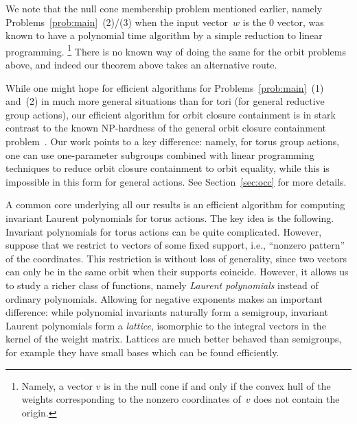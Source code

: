 \documentclass[10pt,a4paper]{article}
\theoremstyle{definition}
\numberwithin{equation}{section}
\begin{document}
We note that the null cone membership problem mentioned earlier, namely Problems~\ref{prob:main}~(2)/(3) when the input vector~$w$ is the $0$ vector,
was known to have a polynomial time algorithm by a simple reduction to linear programming.
\footnote{
Namely, a vector $v$ is in the null cone if and only if the convex hull of the weights corresponding to the nonzero coordinates of~$v$ does not contain the origin.}
There is no known way of doing the same for the orbit problems above, and indeed our theorem above takes an alternative route.

While one might hope for efficient algorithms for Problems~\ref{prob:main}~(1) and~(2) in much more general situations than for tori (for general reductive group actions), our efficient algorithm for orbit closure containment is in stark contrast to the known NP-hardness of the general orbit closure containment problem~\cite{BILPS:20}.
Our work points to a key difference: namely, for torus group actions, one can use one-parameter subgroups combined with linear programming techniques to reduce orbit closure containment to orbit equality, while this is impossible in this form for general actions.
See Section~\ref{sec:occ} for more details.

A common core underlying all our results is an efficient algorithm for computing invariant Laurent polynomials for torus actions.
The key idea is the following.
Invariant polynomials for torus actions can be quite complicated.
However, suppose that we restrict to vectors of some fixed support, i.e., ``nonzero pattern'' of the coordinates.
This restriction is without loss of generality, since two vectors can only be in the same orbit when their supports coincide.
However, it allows us to study a richer class of functions, namely \emph{Laurent polynomials} instead of ordinary polynomials.
Allowing for negative exponents makes an important difference:
while polynomial invariants naturally form a semigroup, invariant Laurent polynomials form a \emph{lattice}, isomorphic to the integral vectors in the kernel of the weight matrix.
Lattices are much better behaved than semigroups, for example they have small bases which can be found efficiently.
\end{document}
